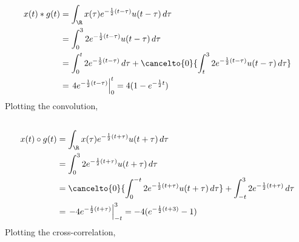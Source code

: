 \documentclass{article}
\begin{document}
\begin{align}
    x(t) \ast g(t) &= \int_{\R} x(\tau) e^{-\frac{1}{2} (t - \tau)} u(t - \tau) \, d\tau \\
    &= \int_0^3 2e^{-\frac{1}{2} (t - \tau)} u(t - \tau) \, d\tau \\
    &= \int_0^t 2e^{-\frac{1}{2} (t - \tau)} \, d\tau + \cancelto{0}{\int_t^3 2e^{-\frac{1}{2} (t - \tau)} u(t - \tau) \, d\tau} \\
    &= \left.4e^{-\frac{1}{2} (t - \tau)}\right|_0^t = 4(1 - e^{-\frac{1}{2} t})
\end{align}
Plotting the convolution,
\begin{center}
\end{center}

\subsection{}

\begin{align}
    x(t) \circ g(t) &= \int_{\R} x(\tau) e^{-\frac{1}{2} (t + \tau)} u(t + \tau) \, d\tau \\
    &= \int_0^3 2e^{-\frac{1}{2} (t + \tau)} u(t + \tau) \, d\tau \\
    &= \cancelto{0}{\int_0^{-t} 2e^{-\frac{1}{2} (t + \tau)} u(t + \tau) \, d\tau} + \int_{-t}^3 2e^{-\frac{1}{2} (t + \tau)} \, d\tau \\
    &= \left.-4e^{-\frac{1}{2} (t + \tau)}\right|_{-t}^3 = -4(e^{-\frac{1}{2} (t + 3)} - 1)
\end{align}
Plotting the cross-correlation,
\begin{center}
\end{center}
\end{document}
